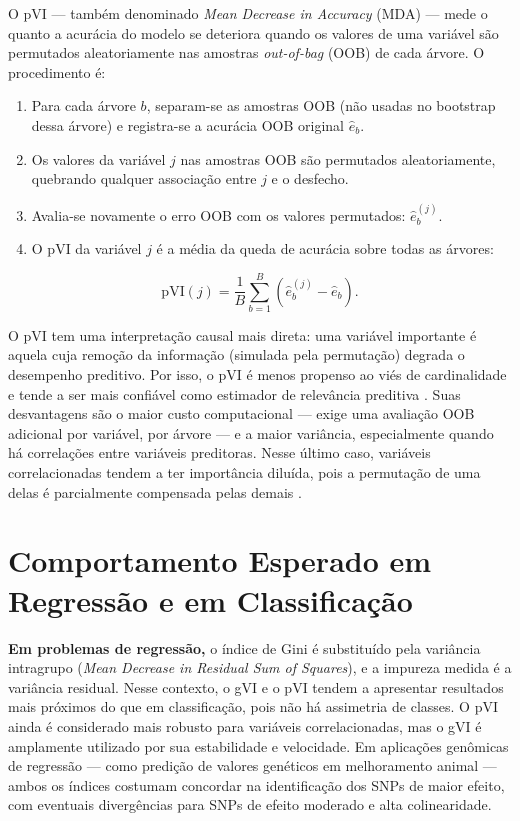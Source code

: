 \documentclass[
    12pt,
    a4paper,
    oneside,
    english,
    french,
    spanish,
    brazil
    ]{abntex2}
\newcommand{\novo}[1]{\textcolor{corNova}{#1}}
\begin{document}
\novo{O pVI --- também denominado \textit{Mean Decrease in Accuracy} (MDA) --- mede o quanto a acurácia do modelo se deteriora quando os valores de uma variável são permutados aleatoriamente nas amostras \textit{out-of-bag} (OOB) de cada árvore. O procedimento é:
\begin{enumerate}
  \item Para cada árvore $b$, separam-se as amostras OOB (não usadas no bootstrap dessa árvore) e registra-se a acurácia OOB original $\hat{e}_b$.
  \item Os valores da variável $j$ nas amostras OOB são permutados aleatoriamente, quebrando qualquer associação entre $j$ e o desfecho.
  \item Avalia-se novamente o erro OOB com os valores permutados: $\hat{e}_b^{(j)}$.
  \item O pVI da variável $j$ é a média da queda de acurácia sobre todas as árvores:
\end{enumerate}
\begin{equation}
  \mathrm{pVI}(j) = \frac{1}{B} \sum_{b=1}^{B} \left(\hat{e}_b^{(j)} - \hat{e}_b\right).
\end{equation}}

\novo{O pVI tem uma interpretação causal mais direta: uma variável importante é aquela cuja remoção da informação (simulada pela permutação) degrada o desempenho preditivo. Por isso, o pVI é menos propenso ao viés de cardinalidade e tende a ser mais confiável como estimador de relevância preditiva \cite{strobl2008conditional}. Suas desvantagens são o maior custo computacional --- exige uma avaliação OOB adicional por variável, por árvore --- e a maior variância, especialmente quando há correlações entre variáveis preditoras. Nesse último caso, variáveis correlacionadas tendem a ter importância diluída, pois a permutação de uma delas é parcialmente compensada pelas demais \cite{strobl2008conditional}.}

\section*{Comportamento Esperado em Regressão e em Classificação}

\novo{\textbf{Em problemas de regressão,} o índice de Gini é substituído pela variância intragrupo (\textit{Mean Decrease in Residual Sum of Squares}), e a impureza medida é a variância residual. Nesse contexto, o gVI e o pVI tendem a apresentar resultados mais próximos do que em classificação, pois não há assimetria de classes. O pVI ainda é considerado mais robusto para variáveis correlacionadas, mas o gVI é amplamente utilizado por sua estabilidade e velocidade. Em aplicações genômicas de regressão --- como predição de valores genéticos em melhoramento animal \cite{de2014snps} --- ambos os índices costumam concordar na identificação dos SNPs de maior efeito, com eventuais divergências para SNPs de efeito moderado e alta colinearidade.}
\end{document}
